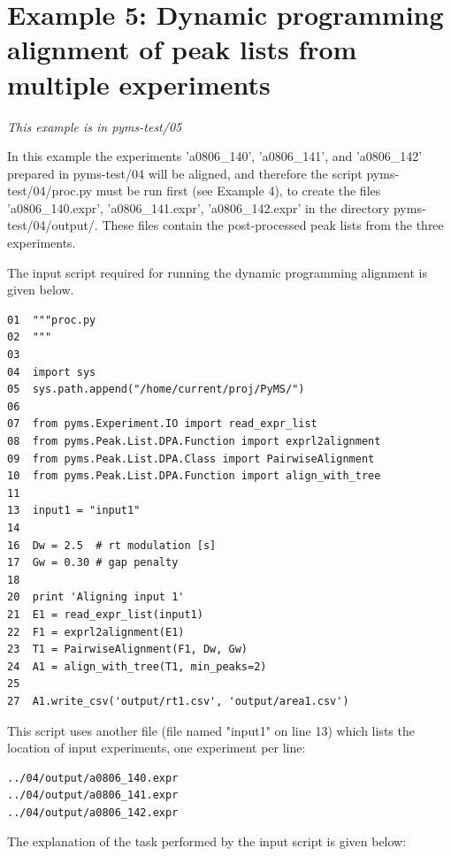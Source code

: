\section{Example 5: Dynamic programming alignment of peak lists from multiple
experiments}

\noindent
{\em This example is in pyms-test/05}

In this example the experiments 'a0806\_140', 'a0806\_141', and 'a0806\_142'
prepared in pyms-test/04 will be aligned, and therefore the script
pyms-test/04/proc.py must be run first (see Example 4), to create the files
'a0806\_140.expr', 'a0806\_141.expr', 'a0806\_142.expr' in the directory
pyms-test/04/output/. These files contain the post-processed peak lists
from the three experiments. 

The input script required for running the dynamic programming alignment
is given below.

\begin{verbatim}
01  """proc.py
02  """
03 
04  import sys
05  sys.path.append("/home/current/proj/PyMS/")
06  
07  from pyms.Experiment.IO import read_expr_list
08  from pyms.Peak.List.DPA.Function import exprl2alignment
09  from pyms.Peak.List.DPA.Class import PairwiseAlignment
10  from pyms.Peak.List.DPA.Function import align_with_tree
11  
13  input1 = "input1"
14  
16  Dw = 2.5  # rt modulation [s]
17  Gw = 0.30 # gap penalty
18  
20  print 'Aligning input 1'
21  E1 = read_expr_list(input1)
22  F1 = exprl2alignment(E1)
23  T1 = PairwiseAlignment(F1, Dw, Gw)
24  A1 = align_with_tree(T1, min_peaks=2)
25  
27  A1.write_csv('output/rt1.csv', 'output/area1.csv')
\end{verbatim}

\noindent
This script uses another file (file named "input1" on line 13) which lists
the location of input experiments, one experiment per line:

\begin{verbatim}
../04/output/a0806_140.expr
../04/output/a0806_141.expr
../04/output/a0806_142.expr
\end{verbatim}

The explanation of the task performed by the input script is given below:

